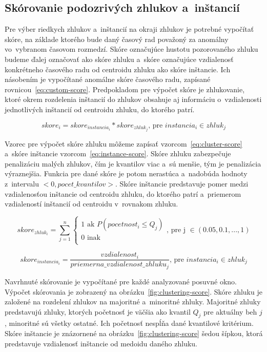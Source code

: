 \documentclass[a4paper,twoside,slovak,12pt,appendix]{article}
\begin{document}
\subsection{Skórovanie podozrivých zhlukov a~inštancií}
Pre výber riedkych zhlukov a~inštancií na okraji zhlukov je potrebné vypočítať
skóre, na základe ktorého bude daný časový rad považoný za anomálny vo~vybranom
časovom rozmedzí. Skóre označujúce hustotu pozorovaného zhluku budeme ďalej
označovať ako skóre zhluku a~skóre označujúce vzdialenosť konkrétneho časového
radu od centroidu zhluku ako skóre inštancie. Ich násobením je vypočítané
anomálne skóre časového radu, zapísané rovnicou~\ref{eq:custom-score}.
Predpokladom pre výpočet skóre je zhlukovanie, ktoré okrem rozdelenia inštancií
do zhlukov obsahuje aj informáciu o~vzdialenosti jednotlivých inštancií od
centroidu zhluku, do ktorého patrí.

\begin{equation}
  skore_i = skore_{instancia_i} * skore_{zhluk_j} \text{, pre } instancia_i \in zhluk_j
  \label{eq:custom-score}
\end{equation}

\noindent
Vzorec pre výpočet skóre zhluku môžeme zapísať vzorcom~\ref{eq:cluster-score}
a~skóre inštancie vzorcom~\ref{eq:instance-score}. Skóre zhluku zabezpečuje
penalizáciu malých zhlukov, čím je kvantilov viac a~sú menšie, tým je
penalizácia výraznejšia. Funkcia pre dané skóre je potom nerastúca
a~nadobúda hodnoty z~intervalu $<0, pocet\_kvantilov>$. Skóre inštancie
predstavuje pomer medzi vzdialenosťou inštancie od centroidu zhluku, do ktorého
patrí a~priemerom vzdialeností inštancií od centroidu v~rovnakom zhluku.

\begin{equation}
  skore_{zhluk_i} = \sum_{j=1}^{n}
  \begin{cases}
    1 \text{ ak } P(pocetnost_i \leq Q_j) \\
    0 \text{ inak } \\
  \end{cases}
  \text{, pre j } \in (0.05, 0.1, ..., 1)
  \label{eq:cluster-score}
\end{equation}

\begin{equation}
  skore_{instancia_i} = \frac{vzdialenost_i}{priemerna\_vzdialenost\_zhluku_j} \text{, pre } instancia_i \in zhluk_j
  \label{eq:instance-score}
\end{equation}

\noindent
Navrhnuté skórovanie je vypočítané pre každé analyzované posuvné okno. Výpočet
skórovania je zobrazený na obrázku~\ref{fig:clustering-score}. Skóre zhluku je
založené na rozdelení zhlukov na majoritné a~minoritné zhluky. Majoritné zhluky
predstavujú zhluky, ktorých početnosť je väčšia ako kvantil $Q_j$ pre aktuálny
beh $j$, minoritné sú všetky ostatné. Ich početnosť nespĺňa dané kvantilové
kritérium. Skóre inštancie je znázornené na obrázku~\ref{fig:clustering-score}
šedou šípkou, ktorá predstavuje vzdialenosť inštancie od medoidu daného zhluku.
\end{document}

